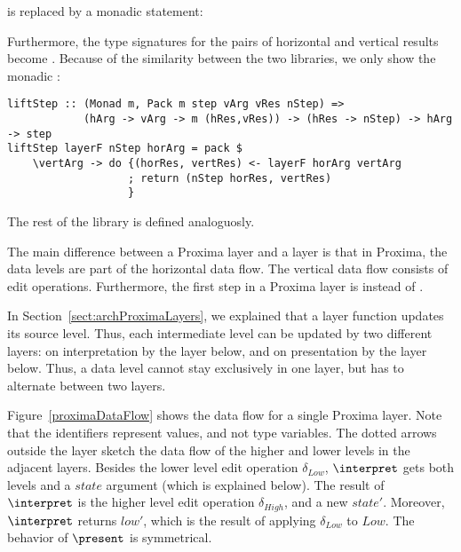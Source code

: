 
is replaced by a monadic statement:


Furthermore, the type signatures for the pairs of horizontal and vertical results  become . Because of the similarity between the two libraries, we only show the monadic :

\begin{small}
\begin{verbatim}
liftStep :: (Monad m, Pack m step vArg vRes nStep) => 
            (hArg -> vArg -> m (hRes,vRes)) -> (hRes -> nStep) -> hArg -> step
liftStep layerF nStep horArg = pack $ 
    \vertArg -> do {(horRes, vertRes) <- layerF horArg vertArg
                   ; return (nStep horRes, vertRes)
                   }
\end{verbatim}
\end{small}

The rest of the library is defined analoguosly.


The main difference between a Proxima layer and a  layer is that in Proxima, the data levels are part of the horizontal data flow. The vertical data flow consists of edit operations. Furthermore, the first step in a Proxima layer is  instead of .

In Section~\ref{sect:archProximaLayers}, we explained that a layer function updates its source level. Thus, each intermediate level can be updated by two different layers: on interpretation by the layer below, and on presentation by the layer below. Thus, a data level cannot stay exclusively in one layer, but has to alternate between two layers.

Figure~\ref{proximaDataFlow} shows the data flow for a single Proxima layer. Note that the identifiers represent values, and not type variables. The dotted arrows outside the layer sketch the data flow of the higher and lower levels in the adjacent layers. Besides the lower level edit operation $\delta_{Low}$, $\interpret$ gets both levels and a $state$ argument (which is explained below). The result of $\interpret$ is the higher level edit operation $\delta_{High}$, and a new $state'$. Moreover, $\interpret$ returns $low'$, which is the result of applying $\delta_{Low}$ to $Low$. The behavior of $\present$ is symmetrical.

